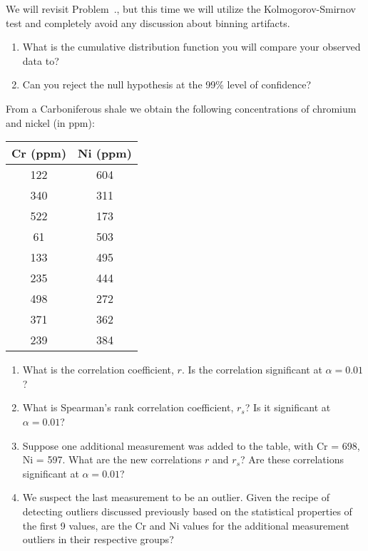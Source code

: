 \begin{problem}
We will revisit Problem~\theqfringec.\theqfringep, but this time we will utilize the Kolmogorov-Smirnov test and completely
avoid any discussion about binning artifacts.
\begin{enumerate}[label=\alph*)]
	\item What is the cumulative distribution function you will compare your observed data to?
	\item Can you reject the null hypothesis at the 99\% level of confidence?
\end{enumerate}
\end{problem}

\begin{problem}
From a Carboniferous shale we obtain the following concentrations of chromium and nickel (in ppm):
\begin{table}[H]
\centering
\begin{tabular}{|c|c|} \hline
\bf{Cr (ppm)}	&	\bf{Ni (ppm)} \\ \hline
122	&	604 \\ \hline
340	&	311 \\ \hline
522	&	173 \\ \hline
61	&	503 \\ \hline
133	&	495 \\ \hline
235	&	444 \\ \hline
498	&	272 \\ \hline
371	&	362 \\ \hline
239	&	384 \\ \hline
\end{tabular}
\end{table}
\begin{enumerate}[label=\alph*)]
\item	What is the correlation coefficient, $r$.  Is the correlation significant at $\alpha = 0.01$?
\item	What is Spearman's rank correlation coefficient, $r_s$? Is it significant at $\alpha = 0.01$?
\item	Suppose one additional measurement was added to the table, with Cr = 698, Ni = 597.
	What are the new correlations $r$ and $r_s$?  Are these correlations significant at $\alpha = 0.01$?
\item	We suspect the last measurement to be an outlier.  Given the recipe of detecting outliers discussed
	previously based on the statistical properties of the first 9 values, are the Cr and Ni values
	for the additional measurement outliers in their respective groups?
\end{enumerate}
\end{problem}

